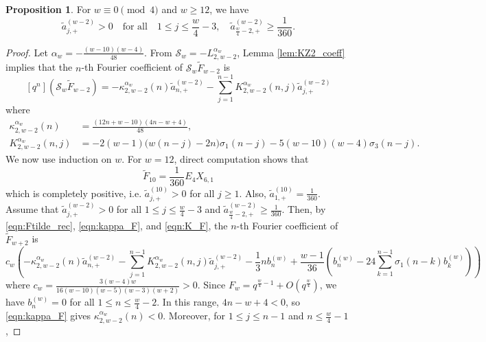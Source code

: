\documentclass[10pt,reqno]{amsproc}
\newcommand{\wtilde}{\widetilde}
\newcommand{\cS}{\mathcal{S}}
\newcommand{\1}{\mathds{1}}	%
\theoremstyle{definition}
\newtheorem{proposition}[theorem]{Proposition}
\theoremstyle{remark}
\begin{document}
\begin{proposition}
    \label{prop:Ftilde_pos}
    For $w \equiv 0 \pmod{4}$ and $w \ge 12$, we have 
    \begin{equation}
        \tilde{a}_{j,+}^{(w-2)} > 0 \quad \text{for all} \quad 1 \le j \le \frac{w}{4} - 3, \quad \tilde{a}_{\frac{w}{4}-2,+}^{(w-2)} \ge \frac{1}{360}.
    \end{equation}
\end{proposition}
\begin{proof}
    Let $\alpha_w = - \frac{(w-10)(w-4)}{48}$.
    From $\cS_w = -L_{2,w-2}^{\alpha_w}$, Lemma \ref{lem:KZ2_coeff} implies that the $n$-th Fourier coefficient of $\cS_w \wtilde{F}_{w-2}$ is
    \[
        [q^n](\cS_w \wtilde{F}_{w-2}) = -\kappa_{2,w-2}^{\alpha_w}(n) \tilde{a}_{n,+}^{(w-2)} - \sum_{j=1}^{n-1} K_{2,w-2}^{\alpha_w}(n, j) \tilde{a}_{j,+}^{(w-2)}
    \]
    where
    \begin{align}
        \kappa_{2,w-2}^{\alpha_w}(n) &= \frac{(12n + w - 10)(4n - w + 4)}{48} \label{eqn:kappa_F}, \\
        K_{2,w-2}^{\alpha_w}(n,j) &= -2(w-1)\bigl(w(n-j)-2n\bigr)\sigma_1(n-j) - 5(w-10)(w-4)\sigma_3(n-j). \label{eqn:K_F}
    \end{align}
    We now use induction on $w$.
    For $w = 12$, direct computation shows that
    \[
    \wtilde{F}_{10} = \frac{1}{360} E_4 X_{6,1}
    \]
    which is completely positive, i.e. $\tilde{a}_{j,+}^{(10)} > 0$ for all $j \ge 1$.
    Also, $\tilde{a}_{1,+}^{(10)} = \frac{1}{360}$.
    Assume that $\tilde{a}_{j,+}^{(w-2)} > 0$ for all $1 \le j \le \frac{w}{4} - 3$ and $\tilde{a}_{\frac{w}{4}-2,+}^{(w-2)} \ge \frac{1}{360}$.
    Then, by \eqref{eqn:Ftilde_rec}, \eqref{eqn:kappa_F}, and \eqref{eqn:K_F}, the $n$-th Fourier coefficient of $\wtilde{F}_{w+2}$ is
    \begin{equation}
        \label{eqn:Ftilde_induction_coeff}
        c_w\left(-\kappa_{2,w-2}^{\alpha_w}(n) \tilde{a}_{n,+}^{(w-2)} - \sum_{j=1}^{n-1} K_{2,w-2}^{\alpha_w}(n,j)\tilde{a}_{j,+}^{(w-2)} - \frac{1}{3}n b_n^{(w)} + \frac{w-1}{36}\left(b_n^{(w)} - 24 \sum_{k=1}^{n-1} \sigma_1(n-k) b_k^{(w)}\right)\right)
    \end{equation}
    where $c_w = \frac{3(w-4)w}{16(w-10)(w-5)(w-3)(w+2)}>0$.
    Since $F_w = q^{\frac{w}{4} - 1} + O(q^{\frac{w}{4}})$, we have $b_n^{(w)} = 0$ for all $1 \leq n \leq \frac{w}{4} - 2$.
    In this range, $4n-w+4<0$, so \eqref{eqn:kappa_F} gives $\kappa_{2,w-2}^{\alpha_w}(n)<0$. Moreover, for $1\leq j\leq n-1$ and $n\leq\frac{w}{4}-1$,

\end{proof}
\end{document}
